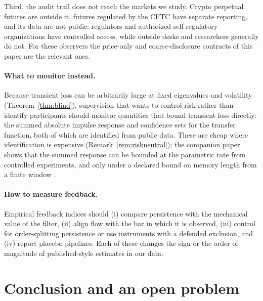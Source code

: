 Third, the audit trail does not reach the markets we study. Crypto perpetual futures are outside it, futures regulated by the CFTC have separate reporting, and its data are not public: regulators and authorized self-regulatory organizations have controlled access, while outside desks and researchers generally do not. For these observers the price-only and coarse-disclosure contracts of this paper are the relevant ones.

\paragraph{What to monitor instead.} Because transient loss can be arbitrarily large at fixed eigenvalues and volatility (Theorem~\ref{thm:blind}), supervision that wants to control risk rather than identify participants should monitor quantities that bound transient loss directly: the summed absolute impulse response and confidence sets for the transfer function, both of which are identified from public data. These are cheap where identification is expensive (Remark~\ref{rem:riskneutral}); the companion paper shows that the summed response can be bounded at the parametric rate from controlled experiments, and only under a declared bound on memory length from a finite window \citep{niroula2026b}.

\paragraph{How to measure feedback.} Empirical feedback indices should (i) compare persistence with the mechanical value of the filter, (ii) align flow with the bar in which it is observed, (iii) control for order-splitting persistence or use instruments with a defended exclusion, and (iv) report placebo pipelines. Each of these changes the sign or the order of magnitude of published-style estimates in our data.

\section{Conclusion and an open problem}\label{sec:conclusion}

